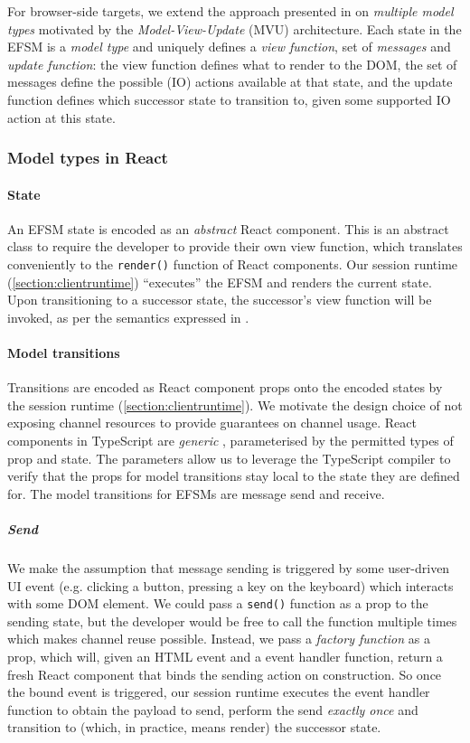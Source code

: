 For browser-side targets, we extend the approach presented in \cite{MVU2019} on
\textit{multiple model types} motivated by the \textit{Model-View-Update} (MVU)
architecture.
Each state in the EFSM is a \emph{model type} and uniquely defines a
\textit{view function}, set of \textit{messages} and \textit{update function}:
the view function defines what to render to the DOM, the set of messages define
the possible (IO) actions available at that state, and the update function
defines which successor state to transition to, given some supported IO action
at this state.

\subsubsection{Model types in React}

\paragraph{State}
An EFSM state is encoded as an \textit{abstract} React
component.
This is an abstract class to require the developer to provide their
own view function, which translates conveniently to the \texttt{render()}
function of React components.
Our session runtime (\cref{section:clientruntime}) ``executes'' the EFSM and
renders the current state.
Upon transitioning to a successor state, the successor's view function will be
invoked, as per the semantics expressed in \cite{MVU2019}.

\paragraph{Model transitions}
Transitions are encoded as React component props onto the encoded states by the
session runtime (\cref{section:clientruntime}).
We motivate the design choice of not exposing channel resources to provide
guarantees on channel usage.
React components in TypeScript are
\textit{generic} \cite{TypeScriptSpec}, parameterised by the permitted
types of prop and state.
The parameters allow us to leverage the TypeScript compiler to
verify that the props for model transitions stay local to the state they are
defined for.
The model transitions for EFSMs are message send and receive.

\subparagraph{Send}
We make the assumption that message sending is triggered by
some user-driven UI event (e.g. clicking a button, pressing a key on the
keyboard) which interacts with some DOM element.
We could pass a
\texttt{send()} function as a prop to the sending state, but the developer
would be free to call the function multiple times which makes channel reuse
possible.
Instead, we pass a \textit{factory function} as a prop, which will,
given an HTML event and a event handler function, return a fresh React
component that binds the sending action on construction.
So once the bound event is triggered, our session runtime executes the event
handler function to obtain the payload to send, perform the send
\textit{exactly once} and transition to (which, in practice, means render) the
successor state.

